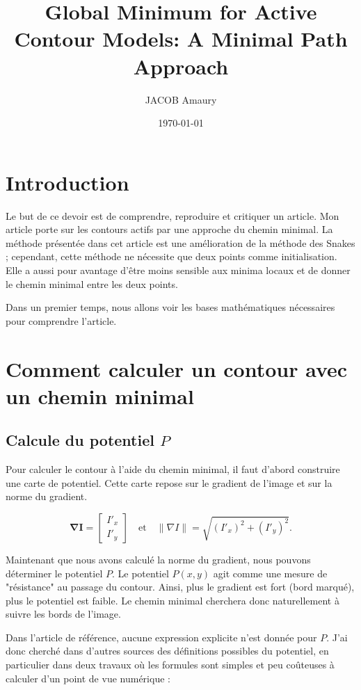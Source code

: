 \documentclass{article}
\title{Global Minimum for Active Contour Models: A Minimal Path Approach}
\author{JACOB Amaury}
\date{\today}
\begin{document}
\maketitle
\tableofcontents

\section{Introduction}
Le but de ce devoir est de comprendre, reproduire et critiquer un article.
Mon article porte sur les contours actifs par une approche du chemin minimal.
La méthode présentée dans cet article est une amélioration de la méthode des Snakes ;
cependant, cette méthode ne nécessite que deux points comme initialisation.
Elle a aussi pour avantage d'être moins sensible aux minima locaux
et de donner le chemin minimal entre les deux points.

Dans un premier temps, nous allons voir les bases mathématiques nécessaires
pour comprendre l'article.

\section{Comment calculer un contour avec un chemin minimal}
\subsection{Calcule du potentiel $P$}

Pour calculer le contour à l’aide du chemin minimal, il faut d’abord construire une carte de potentiel.  
Cette carte repose sur le gradient de l'image et sur la norme du gradient.

\begin{equation}
\mathbf{\nabla I} =
\begin{bmatrix}
I'_x \\[4pt]
I'_y
\end{bmatrix}
\quad\text{et}\quad
\|\nabla I\| = \sqrt{(I'_x)^2 + (I'_y)^2}.
\end{equation}

Maintenant que nous avons calculé la norme du gradient, nous pouvons déterminer le potentiel $P$.
Le potentiel $P(x,y)$ agit comme une mesure de "résistance" au passage du contour.
Ainsi, plus le gradient est fort (bord marqué), plus le potentiel est faible.
Le chemin minimal cherchera donc naturellement à suivre les bords de l’image.


Dans l’article de référence, aucune expression explicite n’est donnée pour $P$.  
J’ai donc cherché dans d’autres sources des définitions possibles du potentiel, en particulier dans deux travaux
où les formules sont simples et peu coûteuses à calculer d’un point de vue numérique :
\end{document}
